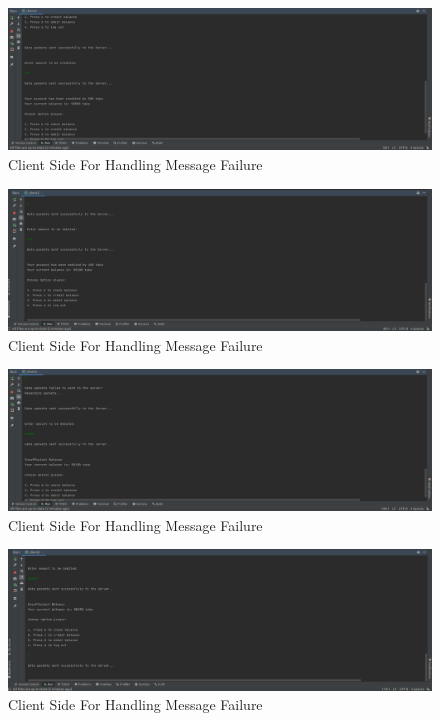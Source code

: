 \documentclass[11pt]{article}
\begin{document}
\begin{figure}[!h]
\centering
\includegraphics[width=\textwidth]{message3.png}
\caption{Client Side For Handling Message Failure}
\end{figure}
\begin{figure}[!h]
\centering
\includegraphics[width=\textwidth]{message4.png}
\caption{Client Side For Handling Message Failure}
\end{figure}
\newpage
\begin{figure}[!h]
\centering
\includegraphics[width=\textwidth]{message5.png}
\caption{Client Side For Handling Message Failure}
\end{figure}
\begin{figure}[!h]
\centering
\includegraphics[width=\textwidth]{message6.png}
\caption{Client Side For Handling Message Failure}
\end{figure}
\end{document}
